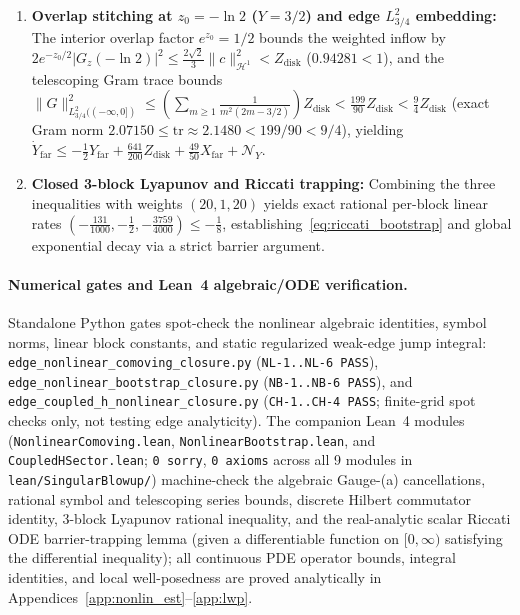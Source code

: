 \documentclass[11pt,a4paper]{article}
\begin{document}
\begin{enumerate}
  and $\|Q_{\mathrm{op}}G\|_{L^\infty},\|\widetilde{Q}_{\mathrm{op}}G\|_{L^\infty}\le (\pi^{-1/2}+\sqrt{2/3})\|G\|_{L^2_{3/4,1/4}} < \frac{7}{5}\|G\|_{L^2_{3/4,1/4}}$.
\item \textbf{Overlap stitching at $z_0=-\ln 2$ ($Y=3/2$) and edge $L^2_{3/4}$ embedding:}
  The interior overlap factor $e^{z_0}=1/2$ bounds the weighted inflow by
  $2e^{-z_0/2}|G_z(-\ln 2)|^2 \le \frac{2\sqrt{2}}{3}\|c\|_{\mathcal{H}^1}^2 < Z_{\mathrm{disk}}$ ($0.94281<1$),
  and the telescoping Gram trace bounds
  $\|G\|_{L^2_{3/4}((-\infty,0])}^2 \le (\sum_{m\ge 1}\frac{1}{m^2(2m-3/2)}) Z_{\mathrm{disk}} < \frac{199}{90}Z_{\mathrm{disk}} < \frac{9}{4}Z_{\mathrm{disk}}$
  (exact Gram norm $2.07150 \le \mathrm{tr}\approx 2.1480 < 199/90 < 9/4$),
  yielding $\dot Y_{\mathrm{far}} \le -\frac{1}{2}Y_{\mathrm{far}} + \frac{641}{200}Z_{\mathrm{disk}} + \frac{49}{50}X_{\mathrm{far}} + \mathcal{N}_Y$.
\item \textbf{Closed 3-block Lyapunov and Riccati trapping:}
  Combining the three inequalities with weights $(20, 1, 20)$ yields exact rational per-block linear rates
  $(-\frac{131}{1000}, -\frac{1}{2}, -\frac{3759}{4000})\le -\frac{1}{8}$, establishing~\eqref{eq:riccati_bootstrap}
  and global exponential decay via a strict barrier argument.
\end{enumerate}

\paragraph{Numerical gates and Lean~4 algebraic/ODE verification.}
Standalone Python gates spot-check the nonlinear algebraic identities, symbol norms, linear block constants, and static regularized weak-edge jump integral:
\texttt{edge\_nonlinear\_\allowbreak comoving\_\allowbreak closure.py} (\texttt{NL-1..NL-6 PASS}),
\texttt{edge\_nonlinear\_\allowbreak bootstrap\_\allowbreak closure.py} (\texttt{NB-1..NB-6 PASS}), and
\texttt{edge\_coupled\_\allowbreak h\_nonlinear\_\allowbreak closure.py} (\texttt{CH-1..CH-4 PASS}; finite-grid spot checks only, not testing edge analyticity).
The companion Lean~4 modules (\texttt{Nonlinear\allowbreak Comoving.lean}, \texttt{Nonlinear\allowbreak Bootstrap.lean}, and
\texttt{CoupledHSector.lean}; \texttt{0~sorry}, \texttt{0~axioms} across all 9 modules in
\texttt{lean/SingularBlowup/})
machine-check the algebraic Gauge-(a) cancellations, rational symbol and telescoping series bounds,
discrete Hilbert commutator identity, 3-block Lyapunov rational inequality, and the real-analytic scalar Riccati ODE barrier-trapping lemma (given a differentiable function on $[0,\infty)$ satisfying the differential inequality); all continuous PDE operator bounds, integral identities, and
local well-posedness are proved analytically in Appendices~\ref{app:nonlin_est}--\ref{app:lwp}.
\end{document}
